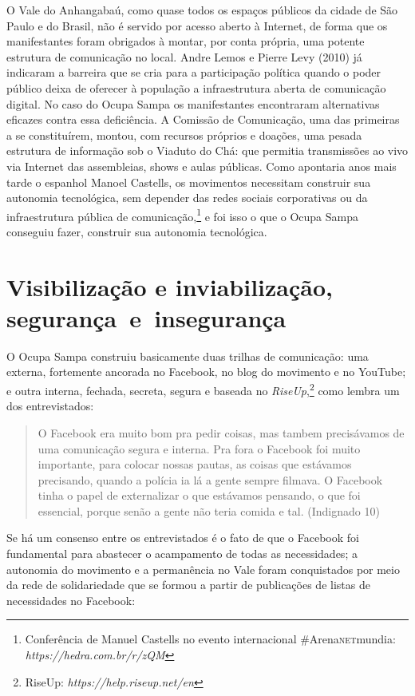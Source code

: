 O Vale do Anhangabaú, como quase todos os espaços públicos da cidade de
São Paulo e do Brasil, não é servido por acesso aberto à Internet, de
forma que os manifestantes foram obrigados à montar, por conta própria,
uma potente estrutura de comunicação no local. Andre Lemos e Pierre Levy
(2010) já indicaram a barreira que se cria para a participação política
quando o poder público deixa de oferecer à população a infraestrutura
aberta de comunicação digital. No caso do Ocupa Sampa os manifestantes
encontraram alternativas eficazes contra essa deficiência. A Comissão de
Comunicação, uma das primeiras a se constituírem, montou, com recursos
próprios e doações, uma pesada estrutura de informação sob o Viaduto do
Chá: que permitia transmissões ao vivo via Internet das assembleias,
shows e aulas públicas. Como apontaria anos mais tarde o espanhol Manoel
Castells, os movimentos necessitam construir sua autonomia tecnológica,
sem depender das redes sociais corporativas ou da infraestrutura pública
de comunicação,\footnote{Conferência de Manuel Castells no evento
  internacional \#Arena\textsc{net}mundia:
  \emph{https://hedra.com.br/r/zQM}}
e foi isso o que o Ocupa Sampa conseguiu fazer, construir sua autonomia
tecnológica.

\section{Visibilização e inviabilização, segurança~e~insegurança}

O Ocupa Sampa construiu basicamente duas trilhas de comunicação: uma
externa, fortemente ancorada no Facebook, no blog do movimento e no
YouTube; e outra interna, fechada, secreta, segura e baseada no
\emph{RiseUp},\footnote{RiseUp: \emph{https://help.riseup.net/en}} como
lembra um dos entrevistados:

\begin{quote}
O Facebook era muito bom pra pedir coisas, mas tambem precisávamos de
uma comunicação segura e interna. Pra fora o Facebook foi muito
importante, para colocar nossas pautas, as coisas que estávamos
precisando, quando a polícia ia lá a gente sempre filmava. O Facebook
tinha o papel de externalizar o que estávamos pensando, o que foi
essencial, porque senão a gente não teria comida e tal. (Indignado 10)
\end{quote}

Se há um consenso entre os entrevistados é o fato de que o
Facebook foi fundamental para abastecer o acampamento de todas as
necessidades; a autonomia do movimento e a permanência no Vale foram
conquistados por meio da rede de solidariedade que se formou a partir de
publicações de listas de necessidades no Facebook:

